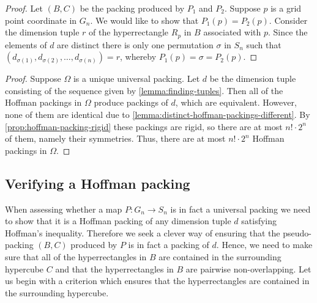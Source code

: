 \begin{proof}
Let $(B, C)$ be the packing produced by $P_1$ and $P_2$. Suppose $p$ is a grid point coordinate in $G_n$. We would like to show that $P_1(p) = P_2(p)$. Consider the dimension tuple $r$ of the hyperrectangle $R_p$ in $B$ associated with $p$. Since the elements of $d$ are distinct there is only one permutation $\sigma$ in $S_n$ such that $(d_{\sigma(1)}, d_{\sigma(2)}, \dotsc, d_{\sigma(n)}) = r$, whereby $P_1(p) = \sigma = P_2(p)$.
\end{proof}

\begin{proof}
Suppose $\Omega$ is a unique universal packing. Let $d$ be the dimension tuple consisting of the sequence given by \cref{lemma:finding-tuples}. Then all of the Hoffman packings in $\Omega$ produce packings of $d$, which are equivalent. However, none of them are identical due to \cref{lemma:distinct-hoffman-packings-different}. By \cref{prop:hoffman-packing-rigid} these packings are rigid, so there are at most $n! \cdot 2^n$ of them, namely their symmetries. Thus, there are at most $n! \cdot 2^n$ Hoffman packings in $\Omega$.
\end{proof}

\subsection{Verifying a Hoffman packing}
When assessing whether a map $P \colon G_n \to S_n$ is in fact a universal packing we need to show that it is a Hoffman packing of any dimension tuple $d$ satisfying Hoffman's inequality. Therefore we seek a clever way of ensuring that the pseudo-packing $(B, C)$ produced by $P$ is in fact a packing of $d$. Hence, we need to make sure that all of the hyperrectangles in $B$ are contained in the surrounding hypercube $C$ and that the hyperrectangles in $B$ are pairwise non-overlapping. Let us begin with a criterion which ensures that the hyperrectangles are contained in the surrounding hypercube.


